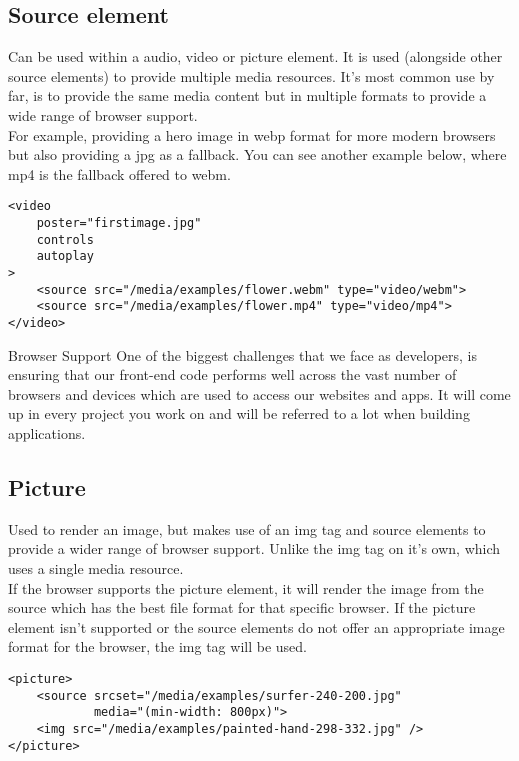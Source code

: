 \subsection{Source element}

Can be used within a audio, video or picture element. It is used (alongside other source elements) to provide multiple media resources. It's most common use by far, is to provide the same media content but in multiple formats to provide a wide range of browser support.
\\

For example, providing a hero image in webp format for more modern browsers but also providing a jpg as a fallback. You can see another example below, where mp4 is the fallback offered to webm.

\begin{verbatim}
<video
    poster="firstimage.jpg"
    controls
    autoplay
>
    <source src="/media/examples/flower.webm" type="video/webm">
    <source src="/media/examples/flower.mp4" type="video/mp4">
</video>
\end{verbatim}

\begin{infobox}{Browser Support}
    One of the biggest challenges that we face as developers, is ensuring that our front-end code performs well across the vast number of browsers and devices which are used to access our websites and apps. It will come up in every project you work on and will be referred to a lot when building applications.
\end{infobox}


\subsection{Picture}

Used to render an image, but makes use of an img tag and source elements to provide a wider range of browser support. Unlike the img tag on it's own, which uses a single media resource.
\\

If the browser supports the picture element, it will render the image from the source which has the best file format for that specific browser. If the picture element isn't supported or the source elements do not offer an appropriate image format for the browser, the img tag will be used.

\begin{verbatim}
<picture>
    <source srcset="/media/examples/surfer-240-200.jpg"
            media="(min-width: 800px)">
    <img src="/media/examples/painted-hand-298-332.jpg" />
</picture>
\end{verbatim}


